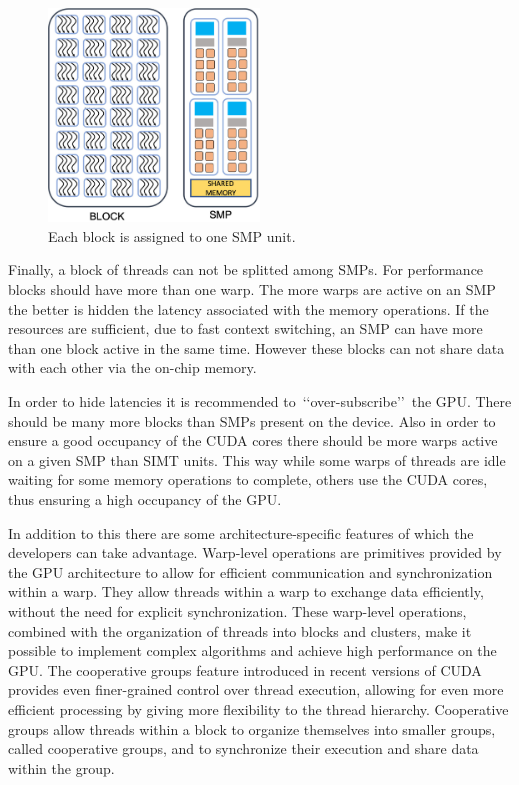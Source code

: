 \begin{figure}[!h]
\centering\includegraphics[width=0.5\textwidth]{fig_hardware/block_smp.jpg}
\caption{Each block is assigned to one SMP unit.}\label{fig:block_smp}
\end{figure}


\par
Finally, a block of threads can not be splitted among SMPs.
For performance blocks should have more than one warp.
The more warps are active on an SMP the better is hidden the latency associated with the memory operations.
If the resources are sufficient, due to fast context switching, an SMP can have more than one block active in the same time.
However these blocks can not share data with each other via the on-chip memory.


\par
In order to hide latencies it is recommended to~\lq\lq over-subscribe\rq\rq~the GPU.
There should be many more blocks than SMPs present on the device.
Also in order to ensure a good occupancy of the CUDA cores there should be more warps active on a given SMP than SIMT units.
This way while some warps of threads are idle waiting for some memory operations to complete, others use the CUDA cores, thus ensuring a high occupancy of the GPU.


\par
In addition to this there are some architecture-specific features of which the developers can take advantage.
Warp-level operations are primitives provided by the GPU architecture to allow for efficient communication and synchronization within a warp.
They allow threads within a warp to exchange data efficiently, without the need for explicit synchronization.
These warp-level operations, combined with the organization of threads into blocks and clusters, make it possible to implement complex algorithms and achieve high performance on the GPU.
The cooperative groups feature introduced in recent versions of CUDA provides even finer-grained control over thread execution, allowing for even more efficient processing by giving more flexibility to the thread hierarchy. Cooperative groups allow threads within a block to organize themselves into smaller groups, called cooperative groups, and to synchronize their execution and share data within the group.


